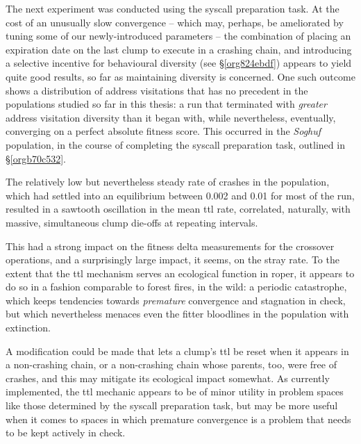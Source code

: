 \documentclass[12pt,glossary]{dalthesis}
\begin{document}
The next experiment was conducted using the syscall preparation task. 
At the cost of an unusually slow convergence -- which may, perhaps, be
ameliorated by tuning some of our newly-introduced parameters -- the combination
of placing an expiration date on the last clump to execute in a crashing chain,
and introducing a selective incentive for behavioural diversity (see \S \ref{org824ebdf}) appears to yield
quite good results, so far as maintaining diversity is concerned. One such outcome
shows a distribution of address visitations that has no precedent in the populations
studied so far in this thesis: a run that terminated with \emph{greater} address visitation
diversity than it began with, while nevertheless, eventually, converging on a perfect
absolute fitness score. This occurred in the \emph{Soghuf} population, in the course of
completing the syscall preparation task, outlined in \S \ref{orgb70c532}.

The relatively low but nevertheless
steady rate of crashes in the population, which had settled into an equilibrium between
0.002 and 0.01 for most of the run, resulted in a sawtooth oscillation in the
mean \gls{ttl} rate, correlated, naturally, with massive, simultaneous clump die-offs at
repeating intervals. 

This had a strong impact on the fitness delta measurements for
the crossover operations, and a surprisingly large impact, it seems, on the stray
rate. To the extent that the \gls{ttl} mechanism serves an ecological function in
\gls{roper}, it appears to do so in a fashion comparable to forest fires, in the wild:
a periodic catastrophe, which keeps tendencies towards \emph{premature} convergence and
stagnation in check, but which nevertheless menaces even the fitter bloodlines in
the population with extinction. 

A modification could be made that lets a clump's \gls{ttl} be reset when
it appears in a non-crashing chain, or a non-crashing chain whose parents, too, were
free of crashes, and this may mitigate its ecological
impact somewhat. As currently implemented, the \gls{ttl} mechanic appears to be of
minor utility in problem spaces like those determined by the syscall preparation
task, but may be more useful when it comes to spaces in which premature
convergence is a problem that needs to be kept actively in check.
\end{document}
